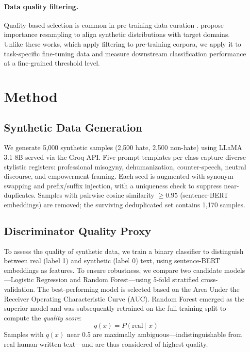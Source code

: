 \documentclass[11pt]{article}
\begin{document}
\paragraph{Data quality filtering.}
Quality-based selection is common in pre-training data curation
\cite{penedo-etal-2023-refinedweb,xie-etal-2023-data}.
\cite{xie-etal-2023-data} propose importance resampling to align synthetic distributions with target domains.
Unlike these works, which apply filtering to pre-training corpora, we apply it to
task-specific fine-tuning data and measure downstream classification performance
at a fine-grained threshold level.

\section{Method}
\label{sec:method}

\subsection{Synthetic Data Generation}
We generate 5{,}000 synthetic samples (2{,}500 hate, 2{,}500 non-hate) using
LLaMA 3.1-8B \cite{grattafiori-etal-2024-llama3} served via the Groq API.
Five prompt templates per class capture diverse stylistic registers:
professional misogyny, dehumanization, counter-speech, neutral discourse,
and empowerment framing.
Each seed is augmented with synonym swapping and prefix/suffix injection,
with a uniqueness check to suppress near-duplicates.
Samples with pairwise cosine similarity $\geq 0.95$ (sentence-BERT embeddings)
are removed; the surviving deduplicated set contains 1{,}170 samples.

\subsection{Discriminator Quality Proxy}
To assess the quality of synthetic data, we train a binary classifier to distinguish between real (label 1) and synthetic (label 0) text, using sentence-BERT embeddings \cite{reimers-gurevych-2019-sentence} as features. To ensure robustness, we compare two candidate models---Logistic Regression and Random Forest---using 5-fold stratified cross-validation. The best-performing model is selected based on the Area Under the Receiver Operating Characteristic Curve (AUC). Random Forest emerged as the superior model and was subsequently retrained on the full training split to compute the \emph{quality score}:
\[
  q(x) = P(\text{real} \mid x)
\]
Samples with $q(x)$ near 0.5 are maximally ambiguous---indistinguishable from real human-written text---and are thus considered of highest quality.
\end{document}
